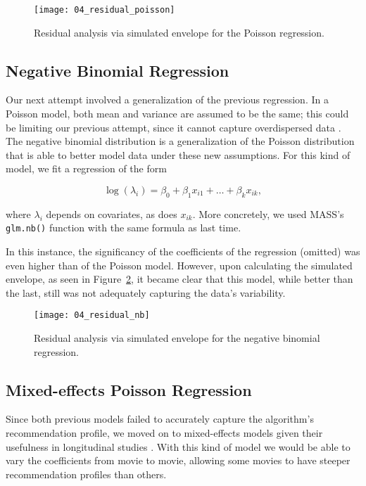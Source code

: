 \begin{figure}
  \centering
  \texttt{[image: 04\_residual\_poisson]}
  \caption{Residual analysis via simulated envelope for the Poisson regression.\label{fig:fig04_residual_poisson}}
\end{figure}

\subsection{Negative Binomial Regression}
\label{subsec:negbin04}

Our next attempt involved a generalization of the previous regression. In a
Poisson model, both mean and variance are assumed to be the same; this could be
limiting our previous attempt, since it cannot capture overdispersed data
\citep{}. The negative binomial distribution is a generalization of the Poisson
distribution \citep{} that is able to better model data under these new
assumptions. For this kind of model, we fit a regression of the form


$$
\log(\lambda_i) = \beta_0 + \beta_1 x_{i1} + \dots + \beta_k x_{ik},
$$

\noindent where $\lambda_i$ depends on covariates, as does $x_{ik}$. More
concretely, we used MASS's \citep{} \verb|glm.nb()| function with the same
formula as last time.

In this instance, the significancy of the coefficients of the regression
(omitted) was even higher than of the Poisson model. However, upon calculating
the simulated envelope, as seen in Figure~\ref{fig:fig04_residual_nb}, it became
clear that  this model, while better than the last, still was not adequately
capturing the data's variability.

\begin{figure}
  \centering
  \texttt{[image: 04\_residual\_nb]}
  \caption{Residual analysis via simulated envelope for the negative binomial regression.\label{fig:fig04_residual_nb}}
\end{figure}

\subsection{Mixed-effects Poisson Regression}
\label{subsec:mmpoisson04}

Since both previous models failed to accurately capture the algorithm's
recommendation profile, we moved on to mixed-effects models \citep{} given their
usefulness in longitudinal studies \citep{}. %
With this kind of model we would be able to vary the coefficients from movie to
movie, allowing some movies to have steeper recommendation profiles than others.

